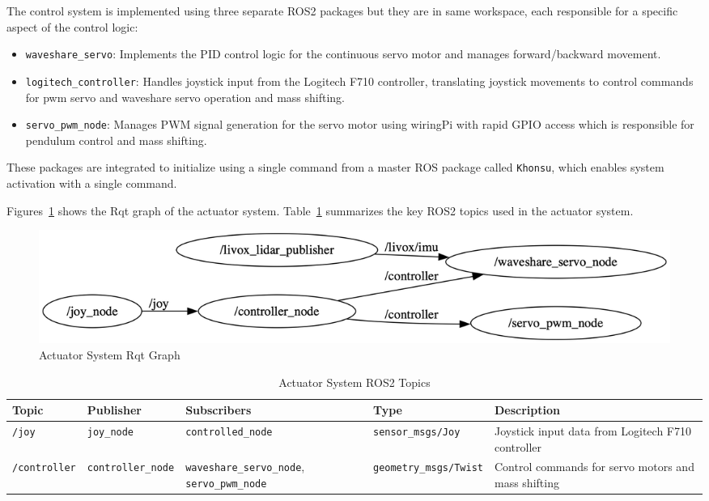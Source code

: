 \documentclass[english, bachelor, utf8]{base/thesis_telematics}
\begin{document}
The control system is implemented using three separate ROS2 packages but they are in same workspace, each responsible for a specific aspect of the control logic:
\begin{itemize}
    \item \texttt{waveshare\_servo}: Implements the PID control logic for the continuous servo motor and manages forward/backward movement.
    \item \texttt{logitech\_controller}: Handles joystick input from the Logitech F710 controller, translating joystick movements to control commands for pwm servo and waveshare servo operation and mass shifting.
    \item \texttt{servo\_pwm\_node}: Manages PWM signal generation for the servo motor using wiringPi with rapid GPIO access which is responsible for pendulum control and mass shifting.
\end{itemize} 
These packages are integrated to initialize using a single command from a master ROS package called \texttt{Khonsu}, which enables system activation with a single command.

Figures~\ref{fig:ros_actuator} shows the Rqt graph of the actuator system.
Table~\ref{tab:actuator_topics} summarizes the key ROS2 topics used in the actuator system.
\begin{figure}[H]
    \centering
    \includegraphics[width=\textwidth]{pics/rqt/ros_actuator.png}
    \caption{Actuator System Rqt Graph}
    \label{fig:ros_actuator}
\end{figure}

\begin{table}[H]
\centering
\caption{Actuator System ROS2 Topics}
\label{tab:actuator_topics}
\scriptsize
\begin{tabularx}{\textwidth}{@{}llXlX@{}}
\toprule
\textbf{Topic} & \textbf{Publisher} & \textbf{Subscribers} & \textbf{Type} & \textbf{Description} \\
\midrule
\texttt{/joy} & \texttt{joy\_node} & \texttt{controlled\_node} & \texttt{sensor\_msgs/Joy} & Joystick input data from Logitech F710 controller \\[0.3em]
\texttt{/controller} & \texttt{controller\_node} & \texttt{waveshare\_servo\_node}, \texttt{servo\_pwm\_node} & \texttt{geometry\_msgs/Twist} & Control commands for servo motors and mass shifting \\
\bottomrule
\end{tabularx}
\end{table}
\end{document}
